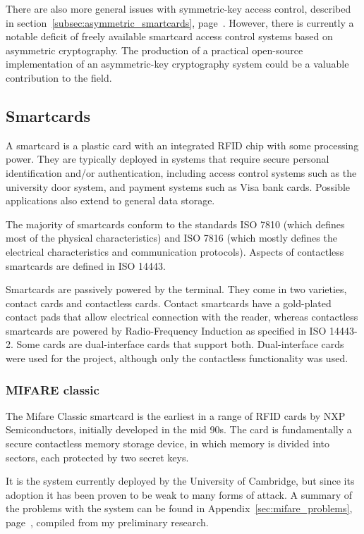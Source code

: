 \documentclass[12pt,a4paper]{article}
\begin{document}
There are also more general issues with symmetric-key access control, described in section~\ref{subsec:asymmetric_smartcards}, page~\pageref{subsec:asymmetric_smartcards}. However, there is currently a notable deficit of freely available smartcard access control systems based on asymmetric cryptography. The production of a practical open-source implementation of an asymmetric-key cryptography system could be a valuable contribution to the field.



 
\subsection{Smartcards}
A smartcard is a plastic card with an integrated RFID chip with some processing power. They are typically deployed in systems that require secure personal identification and/or authentication, including access control systems such as the university door system, and payment systems such as Visa bank cards. Possible applications also extend to general data storage.

The majority of smartcards conform to the standards ISO 7810 (which defines most of the physical characteristics) and ISO 7816 (which mostly defines the electrical characteristics and communication protocols). Aspects of contactless smartcards are defined in ISO 14443.

Smartcards are passively powered by the terminal. They come in two varieties, contact cards and contactless cards. Contact smartcards have a gold-plated contact pads that allow electrical connection with the reader, whereas contactless smartcards are powered by Radio-Frequency Induction as specified in ISO 14443-2. Some cards are dual-interface cards that support both. Dual-interface cards were used for the project, although only the contactless functionality was used.

\subsubsection{MIFARE classic}
The Mifare Classic smartcard is the earliest in a range of RFID cards by NXP Semiconductors, initially developed in the mid 90s. The card is fundamentally a secure contactless memory storage device, in which memory is divided into sectors, each protected by two secret keys.

It is the system currently deployed by the University of Cambridge, but since its adoption it has been proven to be weak to many forms of attack. A summary of the problems with the system can be found in Appendix~\ref{sec:mifare_problems}, page~\pageref{sec:mifare_problems}, compiled from my preliminary research.
\end{document}
